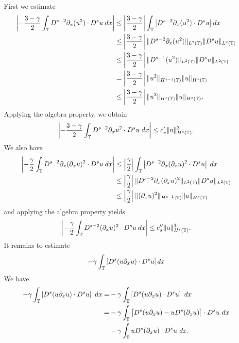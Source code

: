 First we estimate
\begin{equation}
\begin{split}
\left | - \frac{3 -\gamma}{2} \int_{\mathbb{T}} D^{s-2} \partial_x (u^2) \cdot
D^s u \; dx \right |
& \le \left | \frac{3 -\gamma}{2} \right |
\int_{\mathbb{T}} \left |
D^{s-2} \partial_x (u^2) \cdot D^s u \right | dx 
\\
& \le \left | \frac{3 -\gamma}{2} \right |
\|D^{s-2} \partial_x (u^2) \|_{L^2(\mathbb{T})} 
\|D^s u \|_{L^2(\mathbb{T})}
\\
& \le \left | \frac{3 -\gamma}{2} \right |
\|D^{s-1} (u^2) \|_{L^2(\mathbb{T})} 
\|D^s u \|_{L^2(\mathbb{T})}
\\
& = \left | \frac{3 -\gamma}{2} \right |
\| u^2 \|_{H^{s-1}(\mathbb{T})} \| u \|_{H^s(\mathbb{T})}
\\
& \le
\left | \frac{3 -\gamma}{2} \right | \| u^2 \|_{H^s(\mathbb{T})} \| u
\|_{H^s(\mathbb{T})}.
\end{split}
\end{equation}
%
%
Applying the algebra property, we obtain
%
\begin{equation}
\label{hl1-prime}
\begin{split}
\left | -\frac{3 -\gamma}{2} \int_{\mathbb{T}} D^{s-2} \partial_x u^2 \cdot
D^s u \; dx \right |
\le c_s' \| u \|_{H^s(\mathbb{T})}^3.
\end{split}
\end{equation}
%
%
We also have
\begin{equation}
\begin{split}
\left | -\frac{\gamma}{2} \int_{\mathbb{T}} D^{s-2} \partial_x (\partial_x u)^2 \cdot
D^s u \; dx \right |
& \le \left | \frac{\gamma}{2} \right |
\int_{\mathbb{T}} \left | D^{s-2} \partial_x (\partial_x u)^2 
\cdot D^s u \right | \; dx
\\
& \le \left | \frac{\gamma}{2} \right |
\| D^{s-2} \partial_x (\partial_x u)^2 \|_{L^2(\mathbb{T})}
\| D^s u \|_{L^2(\mathbb{T})}
\\
&  \le \left | \frac{\gamma}{2} \right | \|(\partial_x u)^2
\|_{H^{s-1}(\mathbb{T})} \| u \|_{H^s(\mathbb{T})} 
\end{split}
\end{equation}
and applying the algebra property yields
\begin{equation}
\label{hl2-prime}
\left | -\frac{\gamma}{2} \int_{\mathbb{T}} D^{s-2} (\partial_x u)^2 \cdot
D^s u \; dx \right |
\le c_s'' \|u\|_{H^s(\mathbb{T})}^3.
\end{equation}
It remains to estimate 
\begin{equation*}
- \gamma \int_{\mathbb{T}} \left [  D^s (u \partial_x u) \cdot
D^s u \right ]  dx
\end{equation*}
We have
\begin{equation} 
\begin{split}
\label{B-moli-int-v'}
-  \gamma \int_{\mathbb{T}} \left [D^s (u \partial_x u) \cdot D^s
u \right ] \ dx
= &- \gamma  \int_{\mathbb{T}}
\left [ D^s(u \partial_x u) \cdot   D^s u \right ] \ dx
\\
=& - \gamma \int_{\mathbb{T}}
\big[ 
D^s(u\partial_x u)  -  u D^s (\partial_xu)
\big] \cdot
D^s u   \ dx
\\
&
- \gamma \int_{\mathbb{T}}
u D^s (\partial_xu) \cdot
D^su \ dx.
\end{split}
\end{equation}
